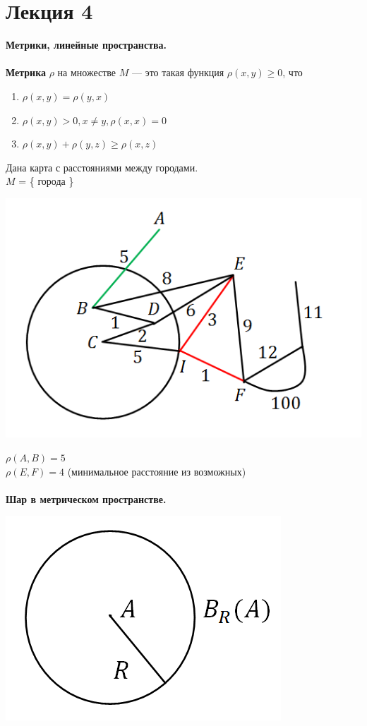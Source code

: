 \documentclass[12pt]{article}
\theoremstyle{definition}
\numberwithin{equation}{section}
\begin{document}
\section *{Лекция 4}
\noindent \textbf{Метрики, линейные пространства.}\\ \\
\textbf{Метрика} $\rho$ на множестве $M$ --- это такая функция $\rho (x, y) \geqslant 0$, что 
\begin{enumerate}
\item $\rho (x, y) = \rho (y, x)$
\item $\rho (x, y) > 0, x\neq y, \rho (x, x) = 0$ 
\item $\rho (x, y) + \rho (y, z) \geqslant \rho (x, z)$
\end{enumerate}
Дана карта с расстояниями между городами.\\
$M$ = \{ города \}\begin{center}
\includegraphics[scale=0.7]{l4_1.png}\end{center}
$\rho (A, B) = 5$\\
$\rho (E, F) = 4$ (минимальное расстояние из возможных)\\
\\
\textbf{Шар в метрическом пространстве.}\begin{center}
\includegraphics[scale=0.5]{l4_2.png}\end{center}
\end{document}
